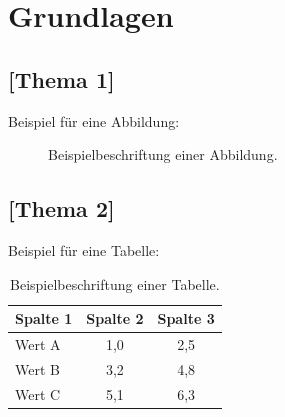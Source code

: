 \chapter{Grundlagen}
\label{chap:grundlagen}

\section{[Thema 1]}

Beispiel für eine Abbildung:
\begin{figure}[H]
    \centering
    \caption{Beispielbeschriftung einer Abbildung.}
    \label{fig:beispiel}
\end{figure}

\section{[Thema 2]}

Beispiel für eine Tabelle:
\begin{table}[H]
    \centering
    \caption{Beispielbeschriftung einer Tabelle.}
    \label{tab:beispiel}
    \begin{tabular}{lcc}
        \toprule
        \textbf{Spalte 1} & \textbf{Spalte 2} & \textbf{Spalte 3} \\
        \midrule
        Wert A & 1{,}0 & 2{,}5 \\
        Wert B & 3{,}2 & 4{,}8 \\
        Wert C & 5{,}1 & 6{,}3 \\
        \bottomrule
    \end{tabular}
\end{table}
